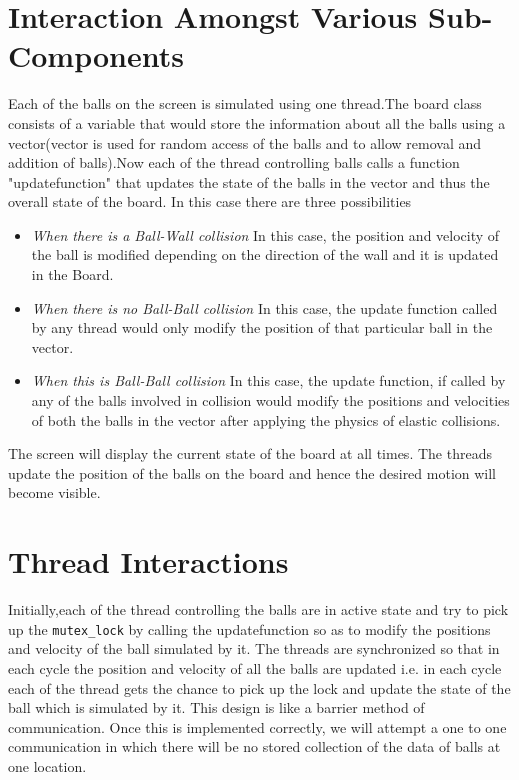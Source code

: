 \documentclass{article}
\begin{document}
\section{Interaction Amongst Various Sub-Components}
Each of the balls on the screen is simulated using one thread.The board class consists of a variable that would store the information about all the balls using a vector(vector is used for random access of the balls and to allow removal and addition of balls).Now each of the thread controlling balls calls a function "updatefunction" that updates the state of the balls in the vector and thus the overall state of the board. In this case there are three possibilities
\begin{itemize}
\item \textit{When there is a Ball-Wall collision} In this case, the position and velocity of the ball is modified depending on the direction of the wall and it is updated in the Board.
\item \textit{When there is no Ball-Ball collision} In this case, the update function called by any thread would only modify the position of that particular ball in the vector.
\item\textit{When this is Ball-Ball collision} In this case, the update function, if called by any of the balls involved in  collision would modify the positions and velocities of both the balls in the vector after applying the physics of elastic collisions. 
\end{itemize}
The screen will display the current state of the board at all times. The threads update the position of the balls on the board and hence the desired motion will become visible.

\section{Thread Interactions}
Initially,each of the thread controlling the balls are in active state and try to pick up the \texttt{mutex\_lock} by calling the updatefunction so as to modify the positions and velocity of the ball simulated by it. The threads are synchronized so that in each cycle the position and velocity of all the balls are updated i.e. in each cycle each of the thread gets the chance to pick up the lock and update the state of the ball which is simulated by it. This design is like a barrier method of communication. Once this is implemented correctly, we will attempt a one to one communication in which there will be no stored collection of the data of balls at one location.  
\end{document}
